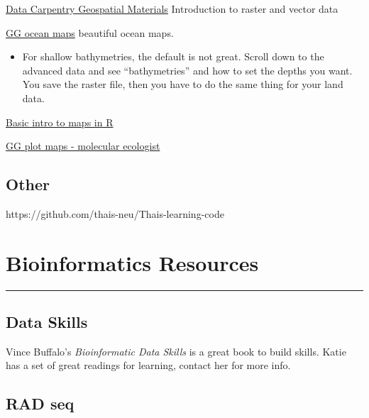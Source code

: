 \documentclass[
  letterpaper,
  DIV=11,
  numbers=noendperiod]{scrreprt}
\providecommand{\tightlist}{%
  \setlength{\itemsep}{0pt}\setlength{\parskip}{0pt}}\usepackage{longtable,booktabs,array}
\begin{document}
\href{https://datacarpentry.org/organization-geospatial/}{Data Carpentry
Geospatial Materials} Introduction to raster and vector data

\href{https://mikkovihtakari.github.io/ggOceanMaps/articles/ggOceanMaps.html\#advanced-use-1}{GG
ocean maps} beautiful ocean maps.

\begin{itemize}
\tightlist
\item
  For shallow bathymetries, the default is not great. Scroll down to the
  advanced data and see ``bathymetries'' and how to set the depths you
  want. You save the raster file, then you have to do the same thing for
  your land data.
\end{itemize}

\href{https://rpubs.com/kvistj/mapping}{Basic intro to maps in R}

\href{https://www.molecularecologist.com/2016/07/01/making-maps-in-r-volume-2-ggplots/}{GG
plot maps - molecular ecologist}

\hypertarget{other}{%
\section*{\texorpdfstring{\textbf{Other}}{Other}}\label{other}}

https://github.com/thais-neu/Thais-learning-code

\hypertarget{bioinformatics-resources}{%
\chapter{Bioinformatics Resources}\label{bioinformatics-resources}}

\begin{center}\rule{0.5\linewidth}{0.5pt}\end{center}

\hypertarget{data-skills}{%
\section*{\texorpdfstring{\textbf{Data
Skills}}{Data Skills}}\label{data-skills}}

Vince Buffalo's \emph{Bioinformatic Data Skills} is a great book to
build skills. Katie has a set of great readings for learning, contact
her for more info.

\hypertarget{rad-seq}{%
\section*{\texorpdfstring{\textbf{RAD seq}}{RAD seq}}\label{rad-seq}}
\end{document}
